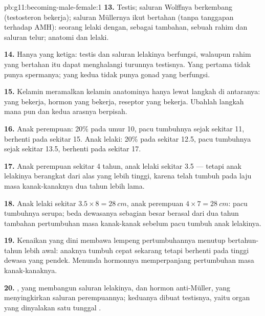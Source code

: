 \begin{solution}{pb:g11:becoming-male-female:1}
\textbf{13.} Testis; saluran Wolffnya berkembang (testosteron bekerja);
saluran Müllernya ikut bertahan (tanpa tanggapan terhadap AMH):
seorang lelaki dengan, sebagai tambahan, sebuah rahim dan saluran
telur; anatomi dan  lelaki.

\textbf{14.} Hanya yang ketiga: testis dan saluran lelakinya berfungsi,
walaupun rahim yang bertahan itu dapat menghalangi turunnya testisnya.
Yang pertama tidak punya  spermanya; yang kedua tidak punya gonad
yang berfungsi.

\textbf{15.} Kelamin  meramalkan kelamin anatominya hanya
lewat langkah di antaranya:  yang bekerja, hormon yang bekerja,
reseptor yang bekerja. Ubahlah langkah mana pun dan kedua arasnya berpisah.

\textbf{16.} Anak perempuan: 20\% pada umur 10, pacu tumbuhnya sejak
sekitar 11, berhenti pada sekitar 15. Anak lelaki: 20\% pada sekitar
12.5, pacu tumbuhnya sejak sekitar 13.5, berhenti pada sekitar 17.

\textbf{17.} Anak perempuan sekitar 4 tahun, anak lelaki sekitar 3.5
--- tetapi anak lelakinya berangkat dari alas yang lebih tinggi, karena
telah tumbuh pada laju masa kanak-kanaknya dua tahun lebih lama.

\textbf{18.} Anak lelaki sekitar $3.5 \times 8 = \qty{28}{cm}$, anak
perempuan $4 \times
7 = \qty{28}{cm}$: pacu tumbuhnya serupa; beda dewasanya sebagian besar
berasal dari dua tahun tambahan pertumbuhan masa kanak-kanak sebelum
pacu tumbuh anak lelakinya.

\textbf{19.} Kenaikan yang dini membawa lempeng pertumbuhannya menutup
bertahun-tahun lebih awal: anaknya tumbuh cepat sekarang tetapi
berhenti pada tinggi dewasa yang pendek. Menunda hormonnya
memperpanjang pertumbuhan masa kanak-kanaknya.

\textbf{20.} , yang membangun saluran lelakinya, dan hormon
anti-Müller, yang menyingkirkan saluran perempuannya; keduanya dibuat
testisnya, yaitu organ yang dinyalakan satu  tunggal .
\end{solution}
